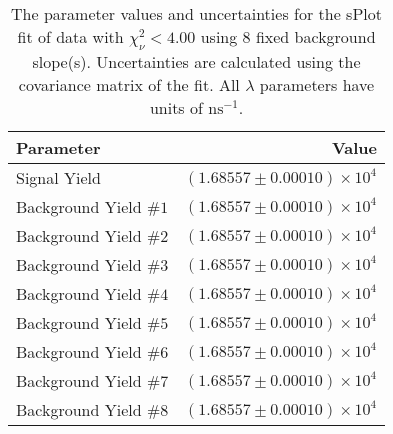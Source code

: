 
\begin{table}
    \begin{center}
        \begin{tabular}{lr}\toprule
            Parameter & Value \\\midrule
            Signal Yield & $(1.68557 \pm 0.00010) \times 10^{4}$ \\
            Background Yield $\#1$ & $(1.68557 \pm 0.00010) \times 10^{4}$ \\
            Background Yield $\#2$ & $(1.68557 \pm 0.00010) \times 10^{4}$ \\
            Background Yield $\#3$ & $(1.68557 \pm 0.00010) \times 10^{4}$ \\
            Background Yield $\#4$ & $(1.68557 \pm 0.00010) \times 10^{4}$ \\
            Background Yield $\#5$ & $(1.68557 \pm 0.00010) \times 10^{4}$ \\
            Background Yield $\#6$ & $(1.68557 \pm 0.00010) \times 10^{4}$ \\
            Background Yield $\#7$ & $(1.68557 \pm 0.00010) \times 10^{4}$ \\
            Background Yield $\#8$ & $(1.68557 \pm 0.00010) \times 10^{4}$ \\\bottomrule
        \end{tabular}
        \caption{The parameter values and uncertainties for the sPlot fit of data with $\chi^2_\nu < 4.00$ using 8 fixed background slope(s). Uncertainties are calculated using the covariance matrix of the fit. All $\lambda$ parameters have units of $\si{\nano\second}^{-1}$.}
    \end{center}
\end{table}
